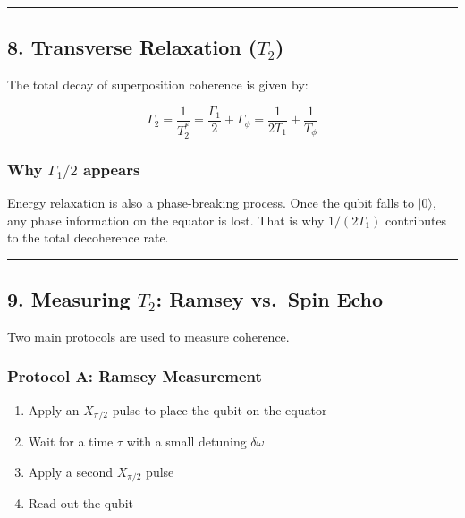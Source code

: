 \documentclass[
]{article}
\providecommand{\tightlist}{%
  \setlength{\itemsep}{0pt}\setlength{\parskip}{0pt}}
\begin{document}
\begin{center}\rule{0.5\linewidth}{0.5pt}\end{center}

\subsection{\texorpdfstring{8. Transverse Relaxation
(\(T_2\))}{8. Transverse Relaxation (T\_2)}}\label{transverse-relaxation-t_2}

The total decay of superposition coherence is given by:

\[
\Gamma_2 = \frac{1}{T_2^*} = \frac{\Gamma_1}{2} + \Gamma_\phi = \frac{1}{2T_1} + \frac{1}{T_\phi}
\]

\subsubsection{\texorpdfstring{Why \(\Gamma_1/2\)
appears}{Why \textbackslash Gamma\_1/2 appears}}\label{why-gamma_12-appears}

Energy relaxation is also a phase-breaking process. Once the qubit falls
to \(|0\rangle\), any phase information on the equator is lost. That is
why \(1/(2T_1)\) contributes to the total decoherence rate.

\begin{center}\rule{0.5\linewidth}{0.5pt}\end{center}

\subsection{\texorpdfstring{9. Measuring \(T_2\): Ramsey vs.~Spin
Echo}{9. Measuring T\_2: Ramsey vs.~Spin Echo}}\label{measuring-t_2-ramsey-vs.-spin-echo}

Two main protocols are used to measure coherence.

\subsubsection{Protocol A: Ramsey
Measurement}\label{protocol-a-ramsey-measurement}

\begin{enumerate}
\def\labelenumi{\arabic{enumi}.}
\tightlist
\item
  Apply an \(X_{\pi/2}\) pulse to place the qubit on the equator
\item
  Wait for a time \(\tau\) with a small detuning \(\delta\omega\)
\item
  Apply a second \(X_{\pi/2}\) pulse
\item
  Read out the qubit
\end{enumerate}
\end{document}
